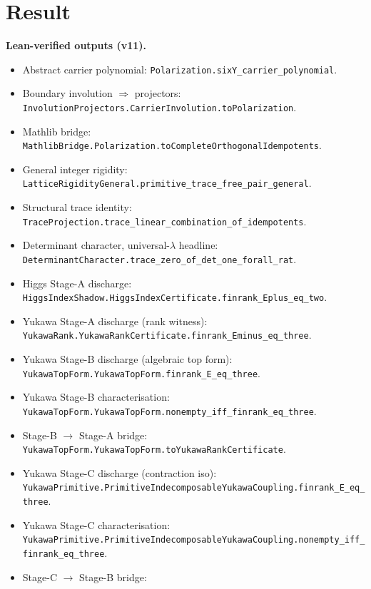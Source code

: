 \section{Result}

\begin{tfptexports}
\textbf{Lean-verified outputs (v11).}
\begin{itemize}[leftmargin=1.5em, itemsep=0pt]
\item Abstract carrier polynomial:
  \texttt{Polarization.sixY\_carrier\_polynomial}.
\item Boundary involution $\Rightarrow$ projectors:
  \texttt{InvolutionProjectors.CarrierInvolution.toPolarization}.
\item Mathlib bridge:
  \texttt{MathlibBridge.Polarization.toCompleteOrthogonalIdempotents}.
\item General integer rigidity:
  \texttt{LatticeRigidityGeneral.primitive\_trace\_free\_pair\_general}.
\item Structural trace identity:
  \texttt{TraceProjection.trace\_linear\_combination\_of\_idempotents}.
\item Determinant character, universal-$\lambda$ headline:
  \texttt{DeterminantCharacter.trace\_zero\_of\_det\_one\_forall\_rat}.
\item Higgs Stage-A discharge:
  \texttt{HiggsIndexShadow.HiggsIndexCertificate.finrank\_Eplus\_eq\_two}.
\item Yukawa Stage-A discharge (rank witness):
  \texttt{YukawaRank.YukawaRankCertificate.finrank\_Eminus\_eq\_three}.
\item Yukawa Stage-B discharge (algebraic top form):
  \texttt{YukawaTopForm.YukawaTopForm.finrank\_E\_eq\_three}.
\item Yukawa Stage-B characterisation:
  \texttt{YukawaTopForm.YukawaTopForm.nonempty\_iff\_finrank\_eq\_three}.
\item Stage-B $\to$ Stage-A bridge:
  \texttt{YukawaTopForm.YukawaTopForm.toYukawaRankCertificate}.
\item Yukawa Stage-C discharge (contraction iso):
  \texttt{YukawaPrimitive.PrimitiveIndecomposableYukawaCoupling.finrank\_E\_eq\_three}.
\item Yukawa Stage-C characterisation:
  \texttt{YukawaPrimitive.PrimitiveIndecomposableYukawaCoupling.nonempty\_iff\_finrank\_eq\_three}.
\item Stage-C $\to$ Stage-B bridge:

\end{itemize}
\end{tfptexports}
